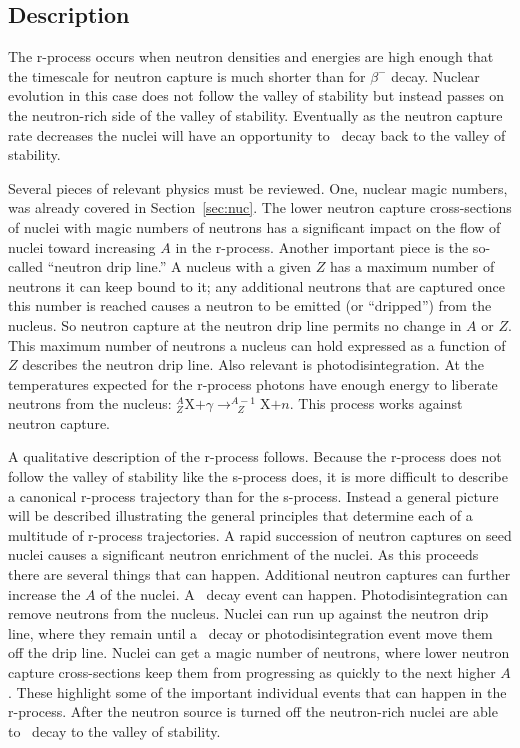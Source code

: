 \label{sec:r}
\subsection{Description}

The r-process occurs when neutron
densities and energies are high enough that the timescale for
neutron capture is much shorter than for $\beta^-$ decay.  Nuclear
evolution in this case does not follow the valley of stability but
instead passes on the neutron-rich side of the valley of stability.
Eventually as the neutron capture rate decreases the nuclei will have
an opportunity to \bminus\ decay back to the valley of stability.

Several pieces of relevant physics must be reviewed.  One, nuclear
magic numbers, was already covered in Section~\ref{sec:nuc}.  The
lower neutron capture cross-sections of nuclei with magic numbers of
neutrons has a significant impact on the flow of nuclei toward
increasing $A$ in the r-process.  Another important piece 
 is the so-called
``neutron drip line.''  A nucleus with a given $Z$ has a maximum
number of neutrons it can keep bound to it; any additional neutrons
that are captured once this number is reached causes a neutron to be
emitted (or ``dripped'') from the nucleus.  So neutron capture at 
the neutron drip line permits no change in $A$ or $Z$.  
This maximum number of neutrons a nucleus can hold expressed as a
function of $Z$ describes the neutron drip line.  Also relevant is
photodisintegration.  At the temperatures expected for the r-process
photons have enough energy to liberate neutrons from the nucleus:
$^A_Z$X$+\gamma \rightarrow _{\ \ \ Z}^{A-1}$X$+n$.  This process
works against neutron capture.

A qualitative description of the r-process follows.  Because the 
r-process does not follow the valley of stability like the
s-process does, it is more difficult to describe a canonical r-process
trajectory than for the s-process.  Instead a general picture
will be described illustrating the general principles that determine
each of a multitude of r-process trajectories.  A
rapid succession of neutron captures on seed nuclei causes a
significant neutron enrichment of the nuclei.  As this proceeds there
are several things that can happen.  Additional neutron captures can
further increase the $A$ of the nuclei.  A \bminus\ decay event can
happen. Photodisintegration can
remove neutrons from the nucleus.  Nuclei can run up against the
neutron drip line, where they remain until a \bminus\ decay or
photodisintegration event move them off the drip line.  Nuclei can
get a magic number of neutrons, where lower neutron capture
cross-sections keep them from progressing as quickly to the next
higher $A$.
These highlight some of the important individual events that can
happen in the r-process. After the neutron source is turned off the 
neutron-rich nuclei are
able to \bminus\ decay to the valley of stability.  


